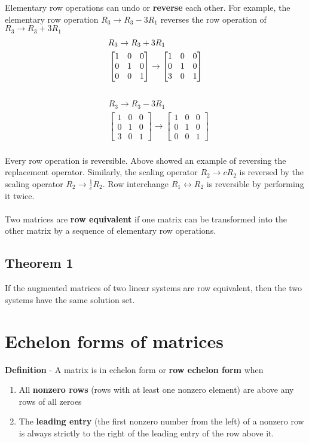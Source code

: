 Elementary row operations can undo or \textbf{reverse} each other. For example, the elementary row operation $R_3 \rightarrow R_3 - 3R_1$ reverses the row operation of $R_3 \rightarrow R_3 + 3R_1$
\[
  \begin{aligned}
    &R_3 \rightarrow R_3 + 3R_1 \\
    &\begin{bmatrix}
      1 & 0 & 0 \\
      0 & 1 & 0 \\
      0 & 0 & 1
    \end{bmatrix} \rightarrow
    \begin{bmatrix}
      1 & 0 & 0 \\
      0 & 1 & 0 \\
      3 & 0 & 1
    \end{bmatrix}
  \end{aligned} \\
\] \\
\[
  \begin{aligned}
    &R_3 \rightarrow R_3 - 3R_1 \\
    &\begin{bmatrix}
      1 & 0 & 0 \\
      0 & 1 & 0 \\
      3 & 0 & 1
    \end{bmatrix} \rightarrow
    \begin{bmatrix}
      1 & 0 & 0 \\
      0 & 1 & 0 \\
      0 & 0 & 1
    \end{bmatrix}
  \end{aligned}
\] \\
Every row operation is reversible. Above showed an example of reversing the replacement operator. 
Similarly, the scaling operator $R_2 \rightarrow cR_2$ is reversed by the scaling operator $R_2 \rightarrow \frac{1}{c}R_2$. 
Row interchange $R_1 \leftrightarrow R_2$ is reversible by performing it twice. \\\\
Two matrices are \textbf{row equivalent} if one matrix can be transformed into the other matrix by a sequence of elementary row operations.
\subsection{Theorem 1}
If the augmented matrices of two linear systems are row equivalent, then the two systems have the same solution set.
\section{Echelon forms of matrices}
\textbf{Definition} - A matrix is in echelon form or \textbf{row echelon form} when
\begin{enumerate}
  \item All \textbf{nonzero rows} (rows with at least one nonzero element) are above any rows of all zeroes
  \item The \textbf{leading entry} (the first nonzero number from the left) of a nonzero row is always strictly to the right of the leading entry of the row above it.
\end{enumerate}
